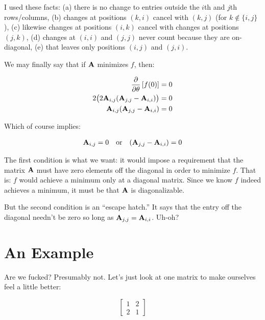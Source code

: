 \documentclass[11pt, oneside]{amsart}
\begin{document}
I used these facts: (a) there is no change to entries outside the $i$th
and $j$th rows/columns, (b) changes at positions $(k, i)$ cancel with
$(k, j)$ (for $k \not\in \{ i, j \}$), (c) likewise changes at positions
$(i, k)$ cancel with changes at positions $(j, k)$, (d) changes at $(i,
i)$ and $(j, j)$ never count because they are on-diagonal, (e) that
leaves only positions $(i, j)$ and $(j, i)$.

We may finally say that if $\mathbf{A}$ minimizes $f$, then:

\begin{equation*}
  \begin{split}
    \frac{\partial }{\partial \theta} \left[ f(0) \right]
      ={}& 0 \\
    2 \big( 2 \mathbf{A}_{i, j} (\mathbf{A}_{j, j} - \mathbf{A}_{i, i}) \big)
      ={}& 0 \\
    \mathbf{A}_{i, j} (\mathbf{A}_{j, j} - \mathbf{A}_{i, i})
      ={}& 0 \\
  \end{split}
\end{equation*}

Which of course implies:

\begin{equation*}
  \begin{split}
    \mathbf{A}_{i, j} = 0
    \quad \text{or} \quad
    (\mathbf{A}_{j, j} - \mathbf{A}_{i, i}) = 0
  \end{split}
\end{equation*}

The first condition is what we want: it would impose a requirement that
the matrix $\mathbf{A}$ must have zero elements off the diagonal in order to
minimize $f$. That is: $f$ would achieve a minimum only at a diagonal
matrix. Since we know $f$ indeed achieves a minimum, it must be that
$\mathbf{A}$ is diagonalizable.

But the second condition is an ``escape hatch.'' It says that the entry
off the diagonal needn't be zero so long as $\mathbf{A}_{j, j} = \mathbf{A}_{i,
i}$. Uh-oh?

\section{An Example}

Are we fucked? Presumably not. Let's just look at one matrix to make
ourselves feel a little better:

\begin{equation*}
  \begin{bmatrix}
    1 & 2 \\
    2 & 1
  \end{bmatrix}
\end{equation*}
\end{document}
